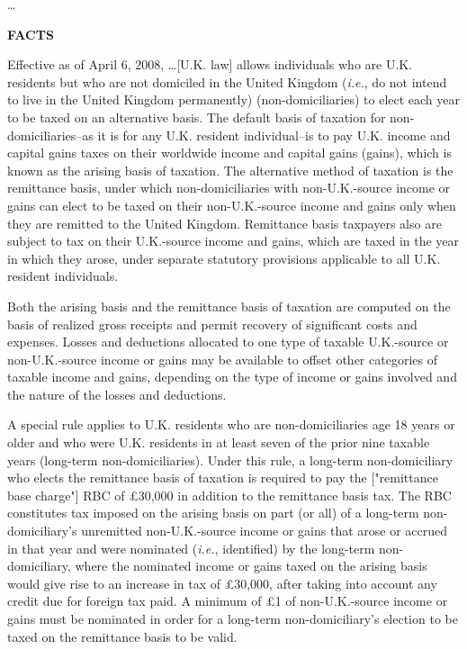 \begin{select}
\ldots\\

\begin{center} \textbf{FACTS}
\end{center}

Effective as of April 6, 2008, \ldots [U.K. law] allows individuals who are U.K. residents but who are not domiciled in the United Kingdom (\emph{i.e.}, do not intend to live in the United Kingdom permanently) (non-domiciliaries) to elect each year to be taxed on an alternative basis. The default basis of taxation for non-domiciliaries--as it is for any U.K. resident individual--is to pay U.K. income and capital gains taxes on their worldwide income and capital gains (gains), which is known as the arising basis of taxation. The alternative method of taxation is the remittance basis, under which non-domiciliaries with non-U.K.-source income or gains can elect to be taxed on their non-U.K.-source income and gains only when they are remitted to the United Kingdom. Remittance basis taxpayers also are subject to tax on their U.K.-source income and gains, which are taxed in the year in which they arose, under separate statutory provisions applicable to all U.K. resident individuals.

Both the arising basis and the remittance basis of taxation are computed on the basis of realized gross receipts and permit recovery of significant costs and expenses. Losses and deductions allocated to one type of taxable U.K.-source or non-U.K.-source income or gains may be available to offset other categories of taxable income and gains, depending on the type of income or gains involved and the nature of the losses and deductions.

A special rule applies to U.K. residents who are non-domiciliaries age 18 years or older and who were U.K. residents in at least seven of the prior nine taxable years (long-term non-domiciliaries). Under this rule, a long-term non-domiciliary who elects the remittance basis of taxation is required to pay the ["remittance base charge"] RBC of \pounds30,000 in addition to the remittance basis tax. The RBC constitutes tax imposed on the arising basis on part (or all) of a long-term non-domiciliary's unremitted non-U.K.-source income or gains that arose or accrued in that year and were nominated (\emph{i.e.}, identified) by the long-term non-domiciliary, where the nominated income or gains taxed on the arising basis would give rise to an increase in tax of \pounds30,000, after taking into account any credit due for foreign tax paid. A minimum of \pounds1 of non-U.K.-source income or gains must be nominated in order for a long-term non-domiciliary's election to be taxed on the remittance basis to be valid.


\end{select}
